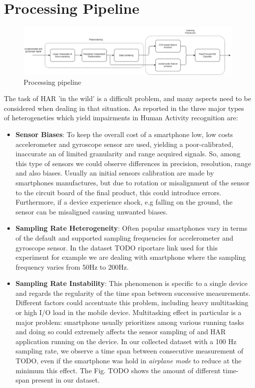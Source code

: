 
\section{Processing Pipeline}
\label{sec:processing_architecture}

\begin{figure}[h]
	\centering
	\includegraphics[width=1\textwidth]{images/processing_pipeline.jpg}
	\caption{Processing pipeline}
\end{figure}

The task of HAR 'in the wild' is a difficult problem, and many aspects need to be considered when dealing in that situation. As reported in \cite{blunck2013heterogeneity} the three major types of heterogeneties which yield impairments in Human Activity recognition are:
\begin{itemize}
	\item \textbf{Sensor Biases}: To keep the overall cost of a smartphone low, low costs accelerometer and gyroscope sensor are used, yielding a poor-calibrated, inaccurate an of limited granularity and range acquired signals. So, among this type of sensors we could observe differences in precision, resolution, range and also biases. Usually an initial sensors calibration are made by smartphones manufactures, but due to rotation or misalignment of the sensor to the circuit board of the final product, this could introduce errors. Furthermore, if a device experience shock, e.g falling on the ground, the sensor can be misaligned causing unwanted biases.
	\item \textbf{Sampling Rate Heterogeneity}: Often popular smartphones vary in terms of the default and supported sampling frequencies for accelerometer and gyroscope sensor. In the dataset TODO riportare link used for this experiment for example we are dealing with smartphone where the sampling frequency varies from 50Hz to 200Hz.
	\item \textbf{Sampling Rate Instability}: This phenomenon is specific to a single device and regards the regularity of the time span between successive measurements. Different factors could accentuate this problem, including heavy multitasking or high I/O load in the mobile device. Multitasking effect in particular is a major problem: smartphone usually prioritizes among various running tasks and doing so could extremely affects the sensor sampling of and HAR application running on the device. In our collected dataset with a 100 Hz sampling rate, we observe a time span between consecutive measurement of TODO, even if the smartphone was hold in \textit{airplane mode} to reduce at the minimum this effect. The Fig. TODO shows the amount of different time-span present in our dataset.
\end{itemize}


